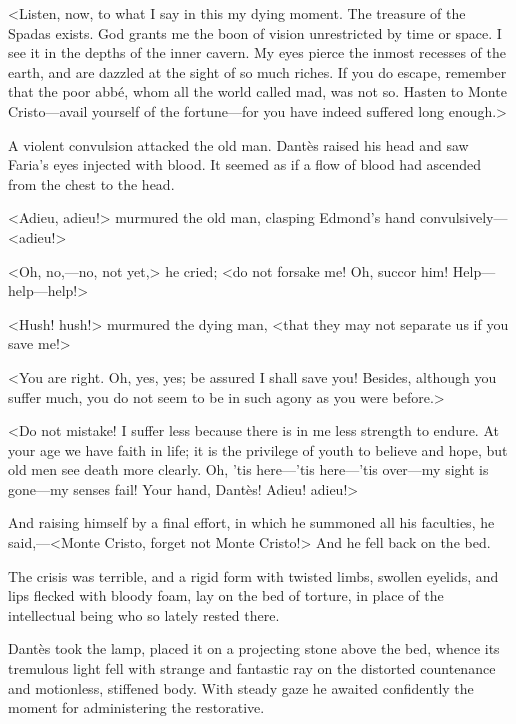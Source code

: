  <Listen, now, to what I say in this my dying moment. The treasure of the Spadas exists. God grants me the boon of vision unrestricted by time or space. I see it in the depths of the inner cavern. My eyes pierce the inmost recesses of the earth, and are dazzled at the sight of so much riches. If you do escape, remember that the poor abbé, whom all the world called mad, was not so. Hasten to Monte Cristo—avail yourself of the fortune—for you have indeed suffered long enough.> 

 A violent convulsion attacked the old man. Dantès raised his head and saw Faria's eyes injected with blood. It seemed as if a flow of blood had ascended from the chest to the head. 

 <Adieu, adieu!> murmured the old man, clasping Edmond's hand convulsively—<adieu!> 

 <Oh, no,—no, not yet,> he cried; <do not forsake me! Oh, succor him! Help—help—help!> 

 <Hush! hush!> murmured the dying man, <that they may not separate us if you save me!> 

 <You are right. Oh, yes, yes; be assured I shall save you! Besides, although you suffer much, you do not seem to be in such agony as you were before.> 

 <Do not mistake! I suffer less because there is in me less strength to endure. At your age we have faith in life; it is the privilege of youth to believe and hope, but old men see death more clearly. Oh, 'tis here—'tis here—'tis over—my sight is gone—my senses fail! Your hand, Dantès! Adieu! adieu!> 

 And raising himself by a final effort, in which he summoned all his faculties, he said,—<Monte Cristo, forget not Monte Cristo!> And he fell back on the bed. 

 The crisis was terrible, and a rigid form with twisted limbs, swollen eyelids, and lips flecked with bloody foam, lay on the bed of torture, in place of the intellectual being who so lately rested there. 

 Dantès took the lamp, placed it on a projecting stone above the bed, whence its tremulous light fell with strange and fantastic ray on the distorted countenance and motionless, stiffened body. With steady gaze he awaited confidently the moment for administering the restorative. 

